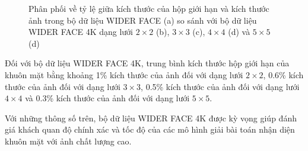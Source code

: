 {\begin{figure}[H]
        \caption{Phân phối về tỷ lệ giữa kích thước của hộp giới hạn và kích thước ảnh trong bộ dữ liệu WIDER FACE \cite{yang2016wider} (a) so sánh với bộ dữ liệu WIDER FACE 4K dạng lưới $2 \times 2$ (b), $3 \times 3$ (c), $4 \times 4$ (d) và $5 \times 5$ (d)}
        \label{fig:widerface_4k_scale}
    \end{figure}

    \noindent
    Đối với bộ dữ liệu WIDER FACE 4K, trung bình kích thước hộp giới hạn của khuôn mặt bằng khoảng 1\% kích thước của ảnh đối với dạng lưới $2 \times 2$, 0.6\% kích thước của ảnh đối với dạng lưới $3 \times 3$, 0.5\% kích thước của ảnh đối với dạng lưới $4 \times 4$ và 0.3\% kích thước của ảnh đối với dạng lưới $5 \times 5$.

    \noindent
    Với những thông số trên, bộ dữ liệu WIDER FACE 4K được kỳ vọng giúp đánh giá khách quan độ chính xác và tốc độ của các mô hình giải bài toán nhận diện khuôn mặt với ảnh chất lượng cao.
}
